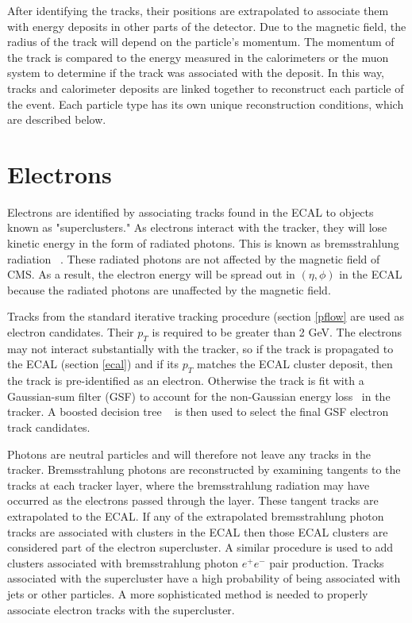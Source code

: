 \documentclass[oneside, letterpaper, oldfontcommands]{memoir}
\begin{document}
\qquad After identifying the tracks, their positions are extrapolated to associate them with energy deposits in other parts of the detector. Due to the magnetic field, the radius of the track will depend on the particle's momentum. The momentum of the track is compared to the energy measured in the calorimeters or the muon system to determine if the track was associated with the deposit. In this way, tracks and calorimeter deposits are linked together to reconstruct each particle of the event. Each particle type has its own unique reconstruction conditions, which are described below.

\section{Electrons}\label{electrons}

\qquad Electrons are identified by associating tracks found in the ECAL to objects known as "superclusters." As electrons interact with the tracker, they will lose kinetic energy in the form of radiated photons. This is known as bremsstrahlung radiation ~\cite{griffiths1999introduction}. These radiated photons are not affected by the magnetic field of CMS. As a result, the electron energy will be spread out in $(\eta,\phi)$ in the ECAL because the radiated photons are unaffected by the magnetic field. 

\qquad Tracks from the standard iterative tracking procedure (section \ref{pflow} are used as electron candidates. Their $p_{T}$ is required to be greater than 2 GeV. The electrons may not interact substantially with the tracker, so if the track is propagated to the ECAL (section \ref{ecal}) and if its $p_{T}$ matches the ECAL cluster deposit, then the track is pre-identified as an electron. Otherwise the track is fit with a Gaussian-sum filter (GSF) to account for the non-Gaussian energy loss~\cite{Adam:815410} in the tracker. A boosted decision tree ~\cite{Hocker:2007ht} is then used to select the final GSF electron track candidates.  

\qquad Photons are neutral particles and will therefore not leave any tracks in the tracker. Bremsstrahlung photons are reconstructed by examining tangents to the tracks at each tracker layer, where the bremsstrahlung radiation may have occurred as the electrons passed through the layer. These tangent tracks are extrapolated to the ECAL. If any of the extrapolated bremsstrahlung photon tracks are associated with clusters in the ECAL then those ECAL clusters are considered part of the electron supercluster. A similar procedure is used to add clusters associated with bremsstrahlung photon $e^{+}e^{-}$ pair production. Tracks associated with the supercluster have a high probability of being associated with jets or other particles. A more sophisticated method is needed to properly associate electron tracks with the supercluster.
\end{document}
